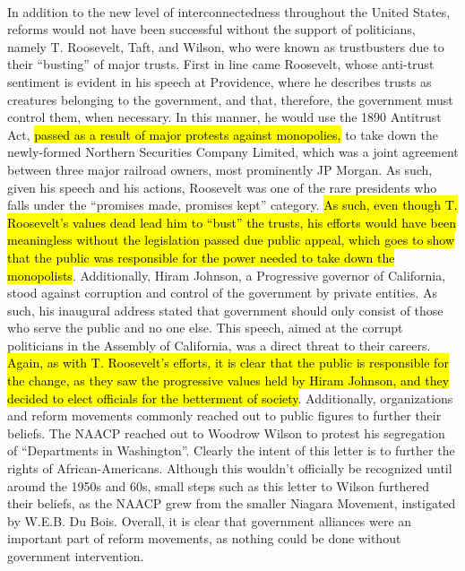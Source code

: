 \documentclass[12pt]{article}
\begin{document}
\paragraph{} In addition to the new level of interconnectedness throughout the United States, reforms would not have been successful without the support of politicians, namely T. Roosevelt, Taft, and Wilson, who were known as trustbusters due to their ``busting'' of major trusts. First in line came Roosevelt, whose anti-trust sentiment is evident in his speech at Providence, where he describes trusts as creatures belonging to the government, and that, therefore, the government must control them, when necessary. In this manner, he would use the 1890 Antitrust Act, \hl{passed as a result of major protests against monopolies,} to take down the newly-formed Northern Securities Company Limited, which was a joint agreement between three major railroad owners, most prominently JP Morgan. As such, given his speech and his actions, Roosevelt was one of the rare presidents who falls under the ``promises made, promises kept'' category. \hl{As such, even though T. Roosevelt's values dead lead him to ``bust'' the trusts, his efforts would have been meaningless without the legislation passed due public appeal, which goes to show that the public was responsible for the power needed to take down the monopolists}.  Additionally, Hiram Johnson, a Progressive governor of California, stood against corruption and control of the government by private entities. As such, his inaugural address stated that government should only consist of those who serve the public and no one else. This speech, aimed at the corrupt politicians in the Assembly of California, was a direct threat to their careers. \hl{Again, as with T. Roosevelt's efforts, it is clear that the public is responsible for the change, as they saw the progressive values held by Hiram Johnson, and they decided to elect officials for the betterment of society}. Additionally, organizations and reform movements commonly reached out to public figures to further their beliefs. The NAACP reached out to Woodrow Wilson to protest his segregation of ``Departments in Washington''. Clearly the intent of this letter is to further the rights of African-Americans. Although this wouldn't officially be recognized until around the 1950s and 60s, small steps such as this letter to Wilson furthered their beliefs, as the NAACP grew from the smaller Niagara Movement, instigated by W.E.B. Du Bois. Overall, it is clear that government alliances were an important part of reform movements, as nothing could be done without government intervention.
\end{document}
